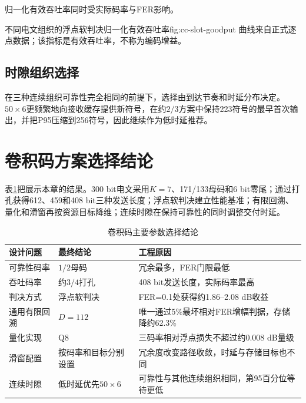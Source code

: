 归一化有效吞吐率同时受实际码率与FER影响。

  {不同电文组织的浮点软判决归一化有效吞吐率}{fig:cc-slot-goodput}
  {曲线来自正式逐点数据；该指标是有效吞吐率，不称为编码增益。}


\subsection{时隙组织选择}

在三种连续组织可靠性完全相同的前提下，选择由到达节奏和时延分布决定。$50\times6$更频繁地向接收缓存提供新符号，在约$2/3$方案中保持223符号的最早首次输出，并把P95压缩到256符号，因此继续作为低时延推荐。

\section{卷积码方案选择结论}

表\ref{tab:cc-main-conclusions}把展示本章的结果。300 bit电文采用$K=7$、171/133母码和6 bit零尾；通过打孔获得612、459和408 bit三种发送长度；浮点软判决建立性能基准；有限回溯、量化和滑窗再按资源目标降维；连续时隙在保持可靠性的同时调整交付时延。

\begin{table}[htbp]
  \centering
  \small
  \caption{卷积码主要参数选择结论}
  \label{tab:cc-main-conclusions}
  \begin{tabular}{p{}p{}p{}}
    \toprule
    设计问题 & 最终结论 & 工程原因 \\
    \midrule
    可靠性码率 & $1/2$母码 & 冗余最多，FER门限最低 \\
    吞吐码率 & 约$3/4$打孔 & 408 bit发送长度，实际码率最高 \\
    判决方式 & 浮点软判决 & FER=0.1处获得约1.86--2.08 dB收益 \\
    通用有限回溯 & $D=112$ & 唯一通过5\%最坏相对FER增幅判据，存储降约62.3\% \\
    量化实现 & Q8 & 三码率相对浮点损失不超过约0.008 dB量级 \\
    滑窗配置 & 按码率和目标分别设置 & 冗余度改变路径收敛，时延与存储目标也不同 \\
    连续时隙 & 低时延优先$50\times6$ & 可靠性与其他连续组织相同，第95百分位等待更低 \\
    \bottomrule
  \end{tabular}
\end{table}


